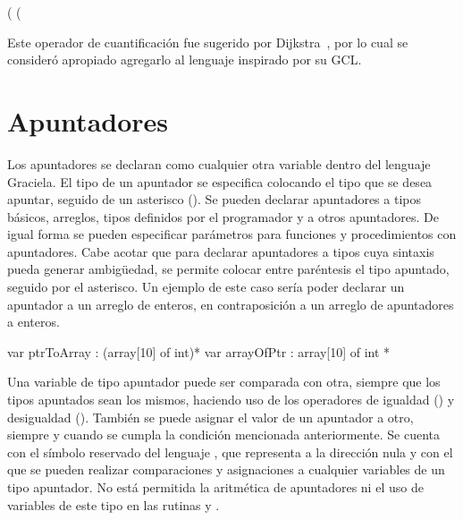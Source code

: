 \begin{gracielacode}[caption=Equivalencia entre cuantificador existencial y \textit{count}, label=lst:existcount]
(%
    (%
\end{gracielacode}

Este operador de cuantificación fue sugerido por Dijkstra~\cite{ewd737}, por lo
cual se consideró apropiado agregarlo al lenguaje inspirado por su GCL.

\section{Apuntadores}

Los apuntadores se declaran como cualquier otra variable dentro del lenguaje
Graciela. El tipo de un apuntador se especifica colocando el tipo que se desea
apuntar, seguido de un asterisco (\ingra{*}). Se pueden declarar apuntadores a
tipos básicos, arreglos, tipos definidos por el programador y a otros
apuntadores. De igual forma se pueden especificar parámetros para funciones y
procedimientos con apuntadores. Cabe acotar que para declarar apuntadores a
tipos cuya sintaxis pueda generar ambigüedad, se permite colocar entre
paréntesis el tipo apuntado, seguido por el asterisco. Un ejemplo de este caso
sería poder declarar un apuntador a un arreglo de enteros, en contraposición a
un arreglo de apuntadores a enteros.

\begin{gracielacode}[caption=Arreglo de apuntadores y apuntador a arreglo, label=lst:arrPtr]
var ptrToArray : (array[10] of int)*
var arrayOfPtr :  array[10] of int *
\end{gracielacode}

Una variable de tipo apuntador puede ser comparada con otra, siempre que los
tipos apuntados sean los mismos, haciendo uso de los operadores de igualdad
(\ingra{==}) y desigualdad (\ingra{!=}). También se puede asignar el valor
de un apuntador a otro, siempre y cuando se cumpla la condición mencionada
anteriormente. Se cuenta con el símbolo reservado del lenguaje
, que representa a la dirección nula y con el que se pueden
realizar comparaciones y asignaciones a cualquier variables de un
tipo apuntador. No está permitida la aritmética de apuntadores ni el uso de
variables de este tipo en las rutinas  y .

